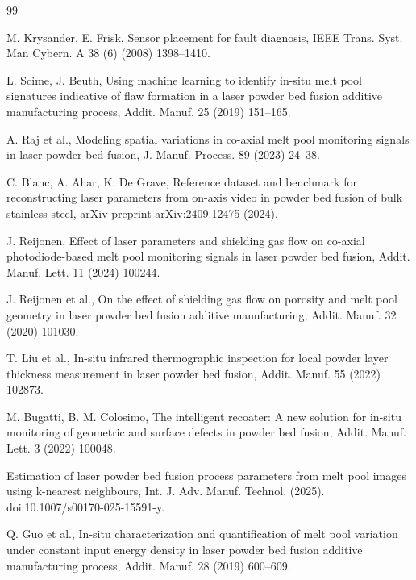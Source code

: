 \documentclass[final,5p,times,twocolumn]{elsarticle}
\begin{document}
\begin{thebibliography}{99}
\scriptsize
\setlength{\itemsep}{-2pt}\setlength{\parskip}{0pt}

M. Krysander, E. Frisk, Sensor placement for fault diagnosis, IEEE Trans. Syst. Man Cybern. A 38 (6) (2008)
1398--1410.

L. Scime, J. Beuth, Using machine learning to identify in-situ melt pool
signatures indicative of flaw formation in a laser powder bed fusion additive
manufacturing process, Addit. Manuf. 25 (2019) 151--165.

A. Raj et al., Modeling spatial variations in co-axial melt pool monitoring signals in laser
powder bed fusion, J. Manuf. Process. 89 (2023) 24--38.

C. Blanc, A. Ahar, K. De Grave, Reference dataset and benchmark for
reconstructing laser parameters from on-axis video in powder bed fusion of bulk
stainless steel, arXiv preprint arXiv:2409.12475 (2024).

J. Reijonen, Effect of laser parameters and shielding gas flow on co-axial
photodiode-based melt pool monitoring signals in laser powder bed fusion,
Addit. Manuf. Lett. 11 (2024) 100244.

J. Reijonen et al., On the effect of shielding gas flow on porosity and melt
pool geometry in laser powder bed fusion additive manufacturing, Addit. Manuf.
32 (2020) 101030.

T. Liu et al., In-situ infrared thermographic inspection for local powder layer
thickness measurement in laser powder bed fusion, Addit. Manuf. 55
(2022) 102873.

M. Bugatti, B. M. Colosimo, The intelligent recoater: A new solution for in-situ
monitoring of geometric and surface defects in powder bed fusion, Addit. Manuf. Lett. 3 (2022) 100048.

Estimation of laser powder bed fusion process parameters from melt pool images
using k-nearest neighbours, Int. J. Adv. Manuf. Technol. (2025). doi:10.1007/s00170-025-15591-y.

Q. Guo et al., In-situ
characterization and quantification of melt pool variation under constant input
energy density in laser powder bed fusion additive manufacturing process,
Addit. Manuf. 28 (2019) 600--609.


\end{thebibliography}
\end{document}
